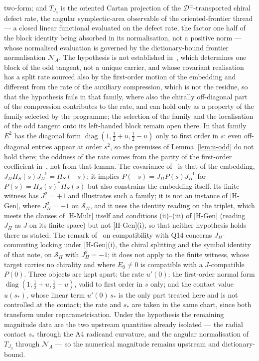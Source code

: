 \documentclass[11pt]{article}
\theoremstyle{definition}
\theoremstyle{remark}
\newcommand{\diag}{\operatorname{diag}}
\begin{document}
      two-form; and $T_{J_3}$ is the oriented Cartan projection
      of the $\mathcal{D}^{\pm}$-transported chiral defect rate, the angular symplectic-area observable of the
      oriented-frontier thread --- a closed linear functional evaluated on the defect rate, the factor one half of the
      block identity being absorbed in its normalisation, not a positive norm --- whose normalised evaluation is
      governed by the dictionary-bound frontier normalisation $\mathcal{N}_A$.
      The hypothesis is not established in~\cite{Beau2026ebj}, which determines one block of the odd tangent, not a
      unique carrier, and whose covariant realisation has a split rate sourced also by the first-order motion of the
      embedding and different from the rate of the auxiliary compression, which is not the residue, so that the
      hypothesis fails in that family, where also the chirally off-diagonal part of the compression contributes to the
      rate, and can hold only as a property of the family selected by the programme; the
      selection of the family and the localisation of the odd tangent onto its left-handed block remain open there.
      In that family $E^2$ has the diagonal form $\diag(1,\tfrac12+u,\tfrac12-u)$ only to first order in $s$: even
      off-diagonal entries appear at order $s^2$, so the premises of Lemma~\ref{lem:u-odd} do not hold there; the
      oddness of the rate comes from the parity of the first-order coefficient in~\cite{Beau2026ebj}, not from that
      lemma.
      The covariance of~\cite{Beau2026ebj} is that of the embedding, $J_\Pi\Pi_S(s)J_\Pi^{-1}=\Pi_S(-s)$; it implies
      $P(-s)=J_\Pi P(s)J_\Pi^{-1}$ for $P(s)=\Pi_S(s)^{*}\Pi_S(s)$ but also constrains the embedding itself.
      Its finite witness has $J^2=+1$ and illustrates such a family; it is not an instance of [H-Gen], where
      $J_\Pi^2=-1$ on $\mathcal S_\Pi$, and it uses the identity reading on the triplet, which meets the clauses of [H-Mult] itself and conditions (ii)--(iii) of [H-Gen] (reading $J_\Pi$ as $J$ on its finite space) but not [H-Gen](i), so that neither hypothesis holds there as stated.
      The remark of~\cite{Beau2026prs} on compatibility with Q14 concerns $J_\Pi$-commuting locking under [H-Gen](i), the
      chiral splitting and the symbol identity of that note, on $\mathcal S_\Pi$ with $J_\Pi^2=-1$; it does not apply to
      the finite witness, whose target carries no chirality and where $E_0\neq0$ is compatible with a $J$-compatible
      $P(0)$.
      Three objects are kept apart: the rate $u'(0)$; the first-order normal form
      $\diag(1,\tfrac12+u,\tfrac12-u)$, valid to first order in $s$ only; and the contact value $u(s_*)$, whose linear
      term $u'(0)\,s_*$ is the only part treated here and is not controlled at the contact; the rate and $s_*$ are
      taken in the same chart, since both transform under reparametrisation.
      Under the hypothesis the remaining magnitude data are the two upstream quantities already isolated --- the radial
      contact $s_*$ through the A4 radicand curvature, and the angular normalisation of $T_{J_3}$ through
      $\mathcal{N}_A$ --- so the numerical magnitude remains upstream and dictionary-bound.
\end{document}

